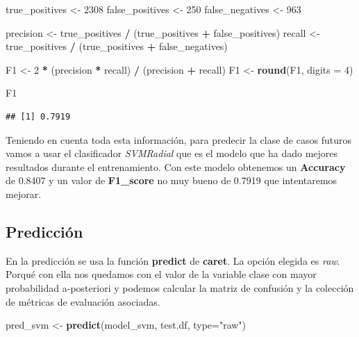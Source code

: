 \documentclass[]{article}
\newenvironment{Shaded}{\begin{snugshade}}{\end{snugshade}}
\newcommand{\DataTypeTok}[1]{\textcolor[rgb]{0.13,0.29,0.53}{#1}}
\newcommand{\DecValTok}[1]{\textcolor[rgb]{0.00,0.00,0.81}{#1}}
\newcommand{\KeywordTok}[1]{\textcolor[rgb]{0.13,0.29,0.53}{\textbf{#1}}}
\newcommand{\NormalTok}[1]{#1}
\newcommand{\OperatorTok}[1]{\textcolor[rgb]{0.81,0.36,0.00}{\textbf{#1}}}
\newcommand{\StringTok}[1]{\textcolor[rgb]{0.31,0.60,0.02}{#1}}
\begin{document}
\begin{Shaded}
\begin{Highlighting}[]
\NormalTok{true_positives <-}\StringTok{ }\DecValTok{2308}
\NormalTok{false_positives <-}\StringTok{ }\DecValTok{250}
\NormalTok{false_negatives <-}\StringTok{ }\DecValTok{963}

\NormalTok{precision <-}\StringTok{ }\NormalTok{true_positives }\OperatorTok{/}\StringTok{ }\NormalTok{(true_positives }\OperatorTok{+}\StringTok{ }\NormalTok{false_positives)}
\NormalTok{recall <-}\StringTok{ }\NormalTok{true_positives }\OperatorTok{/}\StringTok{ }\NormalTok{(true_positives }\OperatorTok{+}\StringTok{ }\NormalTok{false_negatives)}

\NormalTok{F1 <-}\StringTok{ }\DecValTok{2} \OperatorTok{*}\StringTok{ }\NormalTok{(precision }\OperatorTok{*}\StringTok{ }\NormalTok{recall) }\OperatorTok{/}\StringTok{ }\NormalTok{(precision }\OperatorTok{+}\StringTok{ }\NormalTok{recall)}
\NormalTok{F1 <-}\StringTok{ }\KeywordTok{round}\NormalTok{(F1, }\DataTypeTok{digits =} \DecValTok{4}\NormalTok{)}

\NormalTok{F1}
\end{Highlighting}
\end{Shaded}

\begin{verbatim}
## [1] 0.7919
\end{verbatim}

Teniendo en cuenta toda esta información, para predecir la clase de
casos futuros vamos a usar el clasificador \emph{SVMRadial} que es el
modelo que ha dado mejores resultados durante el entrenamiento. Con este
modelo obtenemos un \textbf{Accuracy} de 0.8407 y un valor de
\textbf{F1\_score} no muy bueno de 0.7919 que intentaremos mejorar.

\hypertarget{predicciuxf3n}{%
\subsection{Predicción}\label{predicciuxf3n}}

En la predicción se usa la función \textbf{predict} de \textbf{caret}.
La opción elegida es \emph{raw}. Porqué con ella nos quedamos con el
valor de la variable clase con mayor probabilidad a-posteriori y podemos
calcular la matriz de confusión y la colección de métricas de evaluación
asociadas.

\begin{Shaded}
\begin{Highlighting}[]
\NormalTok{pred_svm <-}\StringTok{ }\KeywordTok{predict}\NormalTok{(model_svm, test.df, }\DataTypeTok{type=}\StringTok{"raw"}\NormalTok{)}
\end{Highlighting}
\end{Shaded}
\end{document}
